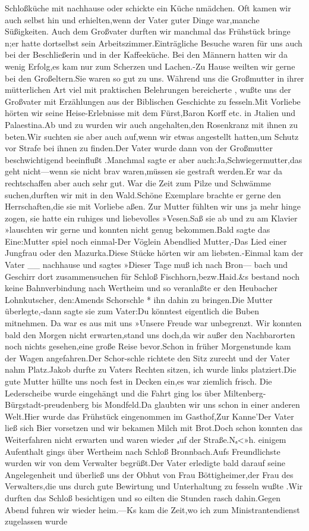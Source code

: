 \documentclass[a4paper,11pt]{article}
\begin{document}
  Schloßküche mit nachhause oder schickte ein Küche nmädchen. Oft kamen wir auch selbst hin und erhielten,wenn der Vater guter Dinge war,manche Süßigkeiten. Auch dem Großvater durften wir manchmal das Frühstück bringe n;er hatte dortselbst sein Arbeitszimmer.Einträgliche Besuche waren für uns auch bei der Beschließerin und in der Kaffeeküche. Bei den Männern hatten wir da wenig Erfolg,es kam nur zum Scherzen und Lachen.-Zu Hause weilten wir gerne bei den Großeltern.Sie waren so gut zu uns. Während uns die Großmutter in ihrer mütterlichen Art viel mit praktischen Belehrungen bereicherte , wußte uns der Großvater mit Erzählungen aus der Biblischen Geschichte zu fesseln.Mit Vorliebe hörten wir seine Heise-Erlebnisse mit dem Fürst,Baron Korff etc. in Jtalien und Palaestina.Ab und zu wurden wir auch angehalten,den Rosenkranz mit ihnen zu beten.Wir suchten sie aber auch auf,wenn wir etwas angestellt hatten,um Schutz vor Strafe bei ihnen zu finden.Der Vater wurde dann von der Großmutter beschwichtigend beeinflußt .Manchmal sagte er aber auch:Ja,Schwiegermutter,das geht nicht—wenn sie nicht brav waren,müssen sie gestraft werden.Er war da rechtschaffen aber auch sehr gut. War die Zeit zum Pilze und Schwämme suchen,durften wir mit in den Wald.Schöne Exemplare brachte er gerne den Herrschaften,die sie mit Vorliebe aßen. Zur Mutter fühlten wir uns ja mehr hinge zogen, sie hatte ein ruhiges und liebevolles »Vesen.Saß sie ab und zu am Klavier »lauschten wir gerne und konnten nicht genug bekommen.Bald sagte das Eine:Mutter spiel noch einmal-Der Vöglein Abendlied Mutter,-Das Lied einer Jungfrau oder den Mazurka.Diese Stücke hörten wir am liebsten.-Einmal kam der Vater __ nachhause und sagtes »Dieser Tage muß ich nach Bron— bach und Geschirr dort zusammensuchen für Schloß Fischhorn,bezw.Haid.&s bestand noch keine Bahnverbindung nach Wertheim und so veranlaßte er den Heubacher Lohnkutscher, den:Amends Schorschle * ihn dahin zu bringen.Die Mutter überlegte,-dann sagte sie zum Vater:Du könntest eigentlich die Buben mitnehmen. Da war es aus mit uns »Unsere Freude war unbegrenzt. Wir konnten bald den Morgen nicht erwarten,stand uns doch,da wir außer den Nachbarorten noch nichts gesehen,eine große Reise bevor.Schon in früher Morgenstunde kam der Wagen angefahren.Der Schor-schle richtete den Sitz zurecht und der Vater nahm Platz.Jakob durfte zu Vaters Rechten sitzen, ich wurde links platziert.Die gute Mutter hüllte uns noch fest in Decken ein,es war ziemlich frisch. Die Lederscheibe wurde eingehängt und die Fahrt ging los über Miltenberg-Bürgstadt-preudenberg bis Mondfeld.Da glaubten wir uns schon in einer anderen Welt.Hier wurde das Frühstück eingenommen im Gasthof,Zur Kanne’Der Vater ließ sich Bier vorsetzen und wir bekamen Milch mit Brot.Doch schon konnten das Weiterfahren nicht erwarten und waren wieder ₐuf der Straße.Nₐ<»h. einigem Aufenthalt gings über Wertheim nach Schloß Bronnbach.Aufs Freundlichste wurden wir von dem Verwalter begrüßt.Der Vater erledigte bald darauf seine Angelegenheit und überließ uns der Obhut von Frau Böttigheimer,der Frau des Verwalters,die uns durch gute Bewirtung und Unterhaltung zu fesseln wußte .Wir durften das Schloß besichtigen und so eilten die Stunden rasch dahin.Gegen Abend fuhren wir wieder heim.—Ks kam die Zeit,wo ich zum Ministrantendienst zugelassen wurde 
\end{document}
